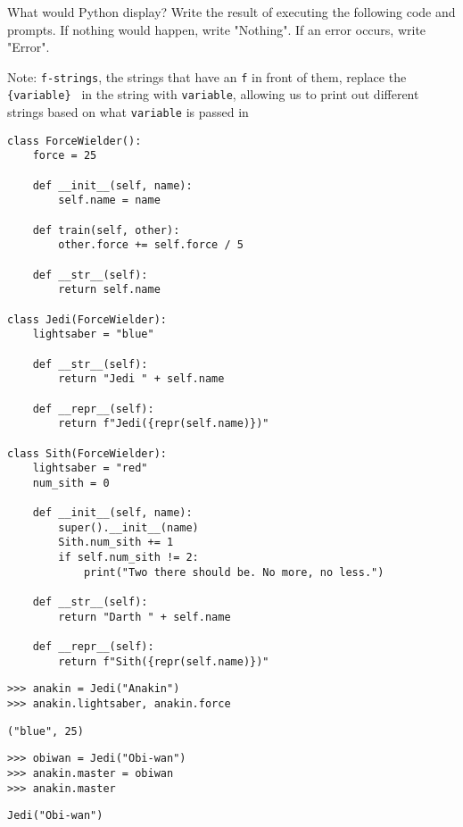 \begin{blocksection}
\question What would Python display? Write the result of executing the following code and prompts. If nothing would happen, write "Nothing". If an error occurs, write "Error".

Note: \lstinline{f-strings}, the strings that have an \lstinline{f} in front of them, replace the \lstinline| {variable} | in the string with \lstinline{variable}, allowing us to print out different strings based on what \lstinline{variable} is passed in

\begin{lstlisting}
class ForceWielder():
    force = 25

    def __init__(self, name):
        self.name = name

    def train(self, other):
        other.force += self.force / 5

    def __str__(self):
        return self.name

class Jedi(ForceWielder):
    lightsaber = "blue"

    def __str__(self):
        return "Jedi " + self.name

    def __repr__(self):
        return f"Jedi({repr(self.name)})"

class Sith(ForceWielder):
    lightsaber = "red"
    num_sith = 0

    def __init__(self, name):
        super().__init__(name)
        Sith.num_sith += 1
        if self.num_sith != 2:
            print("Two there should be. No more, no less.")
        
    def __str__(self):
        return "Darth " + self.name

    def __repr__(self):
        return f"Sith({repr(self.name)})"
\end{lstlisting}
\end{blocksection}

\newpage
\begin{lstlisting}
>>> anakin = Jedi("Anakin")
>>> anakin.lightsaber, anakin.force
\end{lstlisting}
\begin{solution}[.2in]
\begin{lstlisting}
("blue", 25)
\end{lstlisting}
\end{solution}

\begin{lstlisting}
>>> obiwan = Jedi("Obi-wan")
>>> anakin.master = obiwan
>>> anakin.master
\end{lstlisting}
\begin{solution}[.2in]
\begin{lstlisting}
Jedi("Obi-wan")
\end{lstlisting}
\end{solution}

